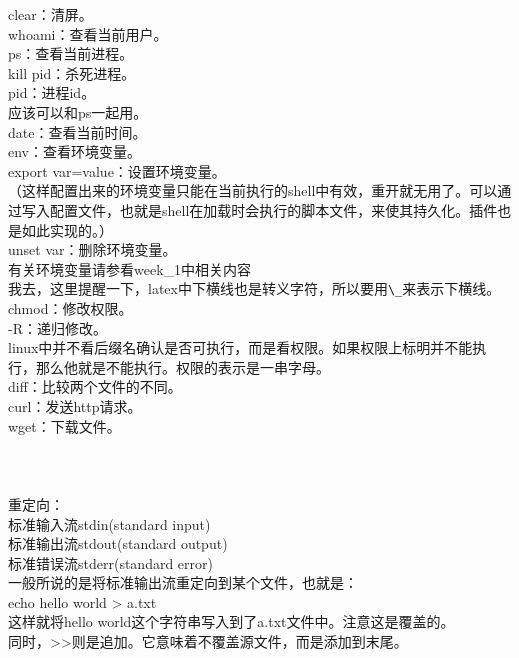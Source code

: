 \documentclass{article}
\begin{document}
\noindent
clear：清屏。\\
whoami：查看当前用户。\\
ps：查看当前进程。\\
kill pid：杀死进程。\\
\hspace*{2em} pid：进程id。\\
\hspace*{2em} 应该可以和ps一起用。\\
date：查看当前时间。\\
env：查看环境变量。\\
export var=value：设置环境变量。\\
（这样配置出来的环境变量只能在当前执行的shell中有效，重开就无用了。可以通过写入配置文件，也就是shell在加载时会执行的脚本文件，来使其持久化。插件也是如此实现的。）\\
unset var：删除环境变量。\\
\hspace*{2em} 有关环境变量请参看week\_1中相关内容\\
\hspace*{2em} 我去，这里提醒一下，latex中下横线也是转义字符，所以要用\verb|\_|来表示下横线。\\

\noindent
chmod：修改权限。\\
\hspace*{2em} -R：递归修改。\\
\hspace*{2em} linux中并不看后缀名确认是否可执行，而是看权限。如果权限上标明并不能执行，那么他就是不能执行。权限的表示是一串字母。\\
diff：比较两个文件的不同。\\

\noindent
curl：发送http请求。\\
wget：下载文件。\\
\\
\\
\\

\noindent
重定向：\\

\noindent
标准输入流stdin(standard input)\\
标准输出流stdout(standard output)\\
标准错误流stderr(standard error)\\

\noindent
一般所说的是将标准输出流重定向到某个文件，也就是：\\
echo hello world > a.txt\\
这样就将hello world这个字符串写入到了a.txt文件中。注意这是覆盖的。\\
同时，>>则是追加。它意味着不覆盖源文件，而是添加到末尾。\\
\end{document}
